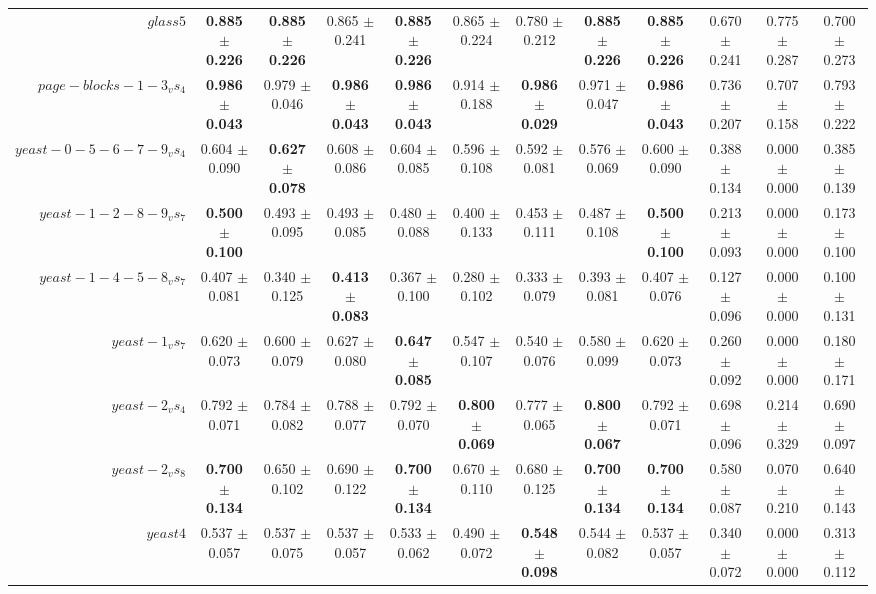 \begin{table}[!ht]
{\begin{tabular}{r c c c c c c c c c c c}
$glass5$ & \textbf{0.885 $\pm$ 0.226} & \textbf{0.885 $\pm$ 0.226} & 0.865 $\pm$ 0.241 & \textbf{0.885 $\pm$ 0.226} & 0.865 $\pm$ 0.224 & 0.780 $\pm$ 0.212 & \textbf{0.885 $\pm$ 0.226} & \textbf{0.885 $\pm$ 0.226} & 0.670 $\pm$ 0.241 & 0.775 $\pm$ 0.287 & 0.700 $\pm$ 0.273 \\
$page-blocks-1-3_vs_4$ & \textbf{0.986 $\pm$ 0.043} & 0.979 $\pm$ 0.046 & \textbf{0.986 $\pm$ 0.043} & \textbf{0.986 $\pm$ 0.043} & 0.914 $\pm$ 0.188 & \textbf{0.986 $\pm$ 0.029} & 0.971 $\pm$ 0.047 & \textbf{0.986 $\pm$ 0.043} & 0.736 $\pm$ 0.207 & 0.707 $\pm$ 0.158 & 0.793 $\pm$ 0.222 \\
$yeast-0-5-6-7-9_vs_4$ & 0.604 $\pm$ 0.090 & \textbf{0.627 $\pm$ 0.078} & 0.608 $\pm$ 0.086 & 0.604 $\pm$ 0.085 & 0.596 $\pm$ 0.108 & 0.592 $\pm$ 0.081 & 0.576 $\pm$ 0.069 & 0.600 $\pm$ 0.090 & 0.388 $\pm$ 0.134 & 0.000 $\pm$ 0.000 & 0.385 $\pm$ 0.139 \\
$yeast-1-2-8-9_vs_7$ & \textbf{0.500 $\pm$ 0.100} & 0.493 $\pm$ 0.095 & 0.493 $\pm$ 0.085 & 0.480 $\pm$ 0.088 & 0.400 $\pm$ 0.133 & 0.453 $\pm$ 0.111 & 0.487 $\pm$ 0.108 & \textbf{0.500 $\pm$ 0.100} & 0.213 $\pm$ 0.093 & 0.000 $\pm$ 0.000 & 0.173 $\pm$ 0.100 \\
$yeast-1-4-5-8_vs_7$ & 0.407 $\pm$ 0.081 & 0.340 $\pm$ 0.125 & \textbf{0.413 $\pm$ 0.083} & 0.367 $\pm$ 0.100 & 0.280 $\pm$ 0.102 & 0.333 $\pm$ 0.079 & 0.393 $\pm$ 0.081 & 0.407 $\pm$ 0.076 & 0.127 $\pm$ 0.096 & 0.000 $\pm$ 0.000 & 0.100 $\pm$ 0.131 \\
$yeast-1_vs_7$ & 0.620 $\pm$ 0.073 & 0.600 $\pm$ 0.079 & 0.627 $\pm$ 0.080 & \textbf{0.647 $\pm$ 0.085} & 0.547 $\pm$ 0.107 & 0.540 $\pm$ 0.076 & 0.580 $\pm$ 0.099 & 0.620 $\pm$ 0.073 & 0.260 $\pm$ 0.092 & 0.000 $\pm$ 0.000 & 0.180 $\pm$ 0.171 \\
$yeast-2_vs_4$ & 0.792 $\pm$ 0.071 & 0.784 $\pm$ 0.082 & 0.788 $\pm$ 0.077 & 0.792 $\pm$ 0.070 & \textbf{0.800 $\pm$ 0.069} & 0.777 $\pm$ 0.065 & \textbf{0.800 $\pm$ 0.067} & 0.792 $\pm$ 0.071 & 0.698 $\pm$ 0.096 & 0.214 $\pm$ 0.329 & 0.690 $\pm$ 0.097 \\
$yeast-2_vs_8$ & \textbf{0.700 $\pm$ 0.134} & 0.650 $\pm$ 0.102 & 0.690 $\pm$ 0.122 & \textbf{0.700 $\pm$ 0.134} & 0.670 $\pm$ 0.110 & 0.680 $\pm$ 0.125 & \textbf{0.700 $\pm$ 0.134} & \textbf{0.700 $\pm$ 0.134} & 0.580 $\pm$ 0.087 & 0.070 $\pm$ 0.210 & 0.640 $\pm$ 0.143 \\
$yeast4$ & 0.537 $\pm$ 0.057 & 0.537 $\pm$ 0.075 & 0.537 $\pm$ 0.057 & 0.533 $\pm$ 0.062 & 0.490 $\pm$ 0.072 & \textbf{0.548 $\pm$ 0.098} & 0.544 $\pm$ 0.082 & 0.537 $\pm$ 0.057 & 0.340 $\pm$ 0.072 & 0.000 $\pm$ 0.000 & 0.313 $\pm$ 0.112 \\

\end{tabular}}
\end{table}
